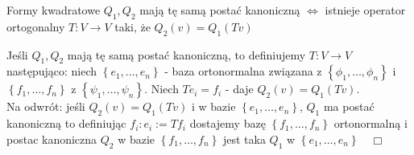 \documentclass[../main.tex]{subfiles}
\begin{document}
    \begin{stw}
        Formy kwadratowe $Q_1,Q_2$ mają tę samą postać kanoniczną $\iff$ istnieje operator ortogonalny $T:V\to V$ taki, że $Q_2(v) = Q_1(Tv)$
    \end{stw}
    \begin{dowod}
        Jeśli $Q_1,Q_2$ mają tę samą postać kanoniczną, to definiujemy $T:V\to V$ następująco:  niech $\left\{ e_1,\ldots,e_n \right\} $ - baza ortonormalna związana z $\left\{ \phi_1,\ldots,\phi_n \right\} $ i $\left\{ f_1,\ldots,f_n \right\} $ z $\left\{ \psi_1,\ldots,\psi_n \right\} $. Niech $Te_i = f_i$ - daje  $Q_2(v) = Q_1(Tv)$.\\
        Na odwrót: jeśli $Q_2(v) = Q_1(Tv)$ i w bazie $\left\{ e_1,\ldots,e_n \right\} $, $Q_1$ ma postać kanoniczną to definiując $f_i: e_i :=T f_i$ dostajemy bazę  $\left\{f_1,\ldots,f_n\right\} $ ortonormalną i postac kanoniczna $Q_2$ w bazie $\left\{ f_1,\ldots,f_n \right\} $ jest taka $Q_1$ w $\left\{ e_1,\ldots,e_n \right\} \quad\Box$
    \end{dowod}
\end{document}
